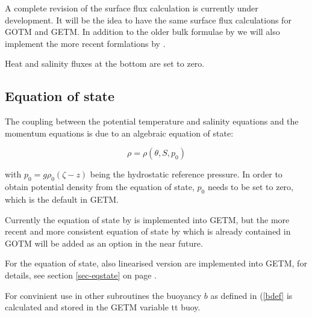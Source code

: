 A complete revision of the surface flux calculation is currently under
development. It will be the idea to have the same surface flux calculations
for GOTM and GETM. In addition to the older bulk formulae by \cite{KONDO75}
we will also implement the more recent formlations by 
\cite{FAIRALLea96}.

Heat and salinity fluxes at the bottom are set to zero. 

\subsection{Equation of state}\label{Section_state_eq}

The coupling between the potential temperature and salinity 
equations and the momentum
equations is due to an algebraic equation of state:

\begin{equation}\label{UNESCO} 
\rho=\rho(\theta,S,p_0)
\end{equation}

with $p_0=g\rho_0(\zeta-z)$ being the hydrostatic reference pressure.
In order to obtain potential density from the equation of state, 
$p_0$ needs to be set to zero, which is the default in GETM.

Currently the equation of state by \cite{FOFONOFFea83} is implemented
into GETM, but the more recent and more consistent equation of state
by \cite{JACKETTea05} which is already contained in GOTM
will be added as an option in the near future.

For the equation of state, also linearised version are implemented into
GETM, for details, see section \ref{sec-eqstate} on page \pageref{sec-eqstate}.

For convinient use in other subroutines the buoyancy $b$ as defined in 
(\ref{bdef} is calculated and stored in the GETM variable {tt buoy}.

